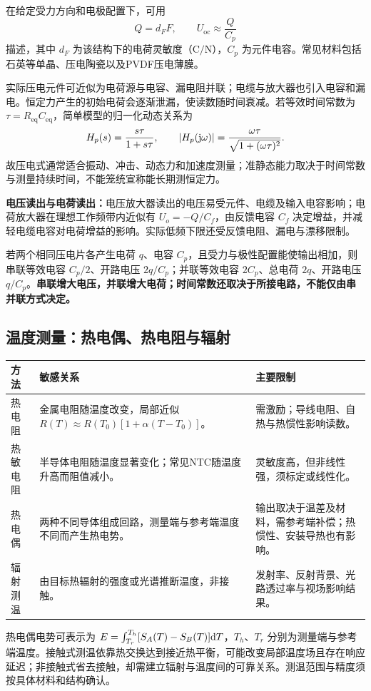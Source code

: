 在给定受力方向和电极配置下，可用
\[
\boxed{Q=d_FF},\qquad U_{\mathrm{oc}}\approx\frac{Q}{C_p}
\]
描述，其中 $d_F$ 为该结构下的电荷灵敏度（$\mathrm{C/N}$），$C_p$ 为元件电容。常见材料包括石英等单晶、压电陶瓷以及PVDF压电薄膜。

实际压电元件可近似为电荷源与电容、漏电阻并联；电缆与放大器也引入电容和漏电。恒定力产生的初始电荷会逐渐泄漏，使读数随时间衰减。若等效时间常数为 $\tau=R_{\mathrm{eq}}C_{\mathrm{eq}}$，简单模型的归一化动态关系为
\[
H_p(s)=\frac{s\tau}{1+s\tau},\qquad
|H_p(\mathrm{j}\omega)|=\frac{\omega\tau}{\sqrt{1+(\omega\tau)^2}}.
\]
故压电式通常适合振动、冲击、动态力和加速度测量；准静态能力取决于时间常数与测量持续时间，不能笼统宣称能长期测恒定力。

\textbf{电压读出与电荷读出：}电压放大器读出的电压易受元件、电缆及输入电容影响；电荷放大器在理想工作频带内近似有 $U_o=-Q/C_f$，由反馈电容 $C_f$ 决定增益，并减轻电缆电容对电荷增益的影响。实际低频下限还受反馈电阻、漏电与漂移限制。

若两个相同压电片各产生电荷 $q$、电容 $C_p$，且受力与极性配置能使输出相加，则串联等效电容 $C_p/2$、开路电压 $2q/C_p$；并联等效电容 $2C_p$、总电荷 $2q$、开路电压 $q/C_p$。\textbf{串联增大电压，并联增大电荷；时间常数还取决于所接电路，不能仅由串并联方式决定。}

\subsection{温度测量：热电偶、热电阻与辐射}
\begin{table}[H]
\centering\small
\begin{tabularx}{\linewidth}{@{}p{2.2cm} X X@{}}
\toprule
方法 & 敏感关系 & 主要限制 \\
\midrule
热电阻 & 金属电阻随温度改变，局部近似 $R(T)\approx R(T_0)[1+\alpha(T-T_0)]$。 & 需激励；导线电阻、自热与热惯性影响读数。 \\
热敏电阻 & 半导体电阻随温度显著变化；常见NTC随温度升高而阻值减小。 & 灵敏度高，但非线性强，须标定或线性化。 \\
热电偶 & 两种不同导体组成回路，测量端与参考端温度不同而产生热电势。 & 输出取决于温差及材料，需参考端补偿；热惯性、安装导热也有影响。 \\
辐射测温 & 由目标热辐射的强度或光谱推断温度，非接触。 & 发射率、反射背景、光路透过率与视场影响结果。 \\
\bottomrule
\end{tabularx}
\end{table}

热电偶电势可表示为 $E=\int_{T_r}^{T_h}[S_A(T)-S_B(T)]\mathrm{d} T$，$T_h$、$T_r$ 分别为测量端与参考端温度。接触式测温依靠热交换达到接近热平衡，可能改变局部温度场且存在响应延迟；非接触式省去接触，却需建立辐射与温度间的可靠关系。测温范围与精度须按具体材料和结构确认。

